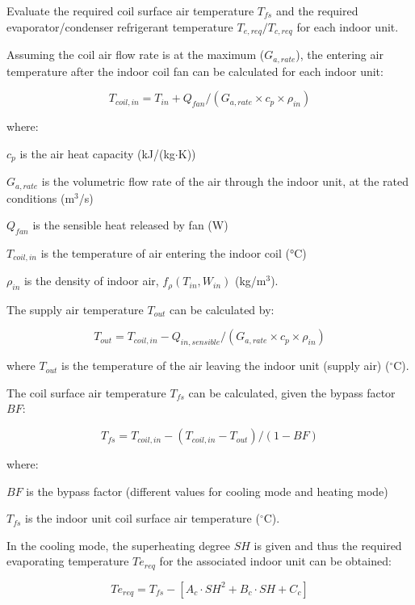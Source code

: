 Evaluate the required coil surface air temperature $T_{fs}$ and the required evaporator/condenser refrigerant temperature $T_{e,req}/{T_{c,req}}$ for each indoor unit. 

Assuming the coil air flow rate is at the maximum ($G_{a,rate}$), the entering air temperature after the indoor coil fan can be calculated for each indoor unit:

\begin{equation}
  T_{coil,in}=T_{in}+Q_{fan}/(G_{a,rate}\times{c_p}\times\rho_{in})
\end{equation}

where:

$c_p$ is the air heat capacity (kJ/(kg$\cdot$K))

$G_{a,rate}$	 is the volumetric flow rate of the air through the indoor unit, at the rated conditions (m\(^3\)/s)

$Q_{fan}$ is the sensible heat released by fan (W)

$T_{coil,in}$ is the temperature of air entering the indoor coil (°C)

$\rho_{in}$ is the density of indoor air, $f_{\rho}(T_{in},W_{in})$ (kg/m\(^3\)).

The supply air temperature $T_{out}$ can be calculated by:

\begin{equation}
  T_{out} = T_{coil,in} - Q_{in, sensible} / (G_{a,rate}\times{c_p}\times\rho_{in})
\end{equation}

where $T_{out}$ is the temperature of the air leaving the indoor unit (supply air) (\(^{\circ}\)C).

The coil surface air temperature $T_{fs}$ can be calculated, given the bypass factor $BF$:

\begin{equation}
  T_{fs}= T_{coil,in} - (T_{coil,in}-T_{out}) / (1-BF)
\end{equation}

where:

$BF$ is the bypass factor (different values for cooling mode and heating mode) 

$T_{fs}$ is the indoor unit coil surface air temperature (\(^{\circ}\)C).

In the cooling mode, the superheating degree $SH$ is given and thus the required evaporating temperature $Te_{req}$ for the associated indoor unit can be obtained:

\begin{equation}
  Te_{req}=T_{fs}-[A_c\cdot SH^2+B_c\cdot SH+C_c]
\end{equation}
 
